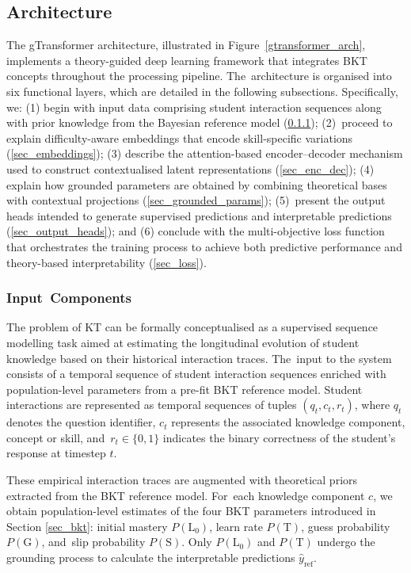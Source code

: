 \documentclass[applsci,article,accept,moreauthors,pdftex]{Definitions/mdpi}
\begin{document}
\subsection{Architecture}

The gTransformer architecture, illustrated in Figure~\ref{gtransformer_arch}, implements a theory-guided deep learning framework that integrates BKT concepts throughout the processing pipeline. The~architecture is {organised} into six functional layers, which are detailed in the following subsections. Specifically, we: (1) begin with input data comprising student interaction sequences along with prior knowledge from the Bayesian reference model (\mbox{\cref{sec_input}}); (2)~proceed to explain difficulty-aware embeddings that encode skill-specific variations (\mbox{\cref{sec_embeddings}}); (3) describe the attention-based encoder--decoder mechanism used to construct {contextualised} latent representations (\cref{sec_enc_dec}); (4) explain how grounded parameters are obtained by combining theoretical bases with contextual projections (\mbox{\cref{sec_grounded_params}}); (5)~present the output heads intended to generate supervised predictions and interpretable predictions (\cref{sec_output_heads}); and (6) conclude with the multi-objective loss function that orchestrates the training process to achieve both predictive performance and theory-based interpretability (\cref{sec_loss}).

\subsubsection{Input~Components} \label{sec_input}

{The problem of KT can be formally conceptualised as a supervised sequence modelling task aimed at estimating the longitudinal evolution of student knowledge based on their historical interaction traces. The~input to the system consists of a temporal sequence of student interaction sequences enriched with population-level parameters from a pre-fit BKT reference model. Student interactions are represented as temporal sequences of tuples $(q_t, c_t, r_t)$, where $q_t$ denotes the question identifier, $c_t$ represents the associated knowledge component, concept or skill, and~$r_t \in \{0, 1\}$ indicates the binary correctness of the student's response at timestep $t$.}

{These empirical interaction traces are augmented with theoretical priors extracted from the BKT reference model. For~each knowledge component $c$, we obtain population-level estimates of the four BKT parameters introduced in Section \ref{sec_bkt}: initial mastery $P(\text{L}_0)$, learn rate $P(\text{T})$, guess probability $P(\text{G})$, and~slip probability $P(\text{S})$. Only $P(\text{L}_0)$ and $P(\text{T})$ undergo the grounding process to calculate the interpretable predictions $\hat{y}_{\text{ref}}$.}
\end{document}
